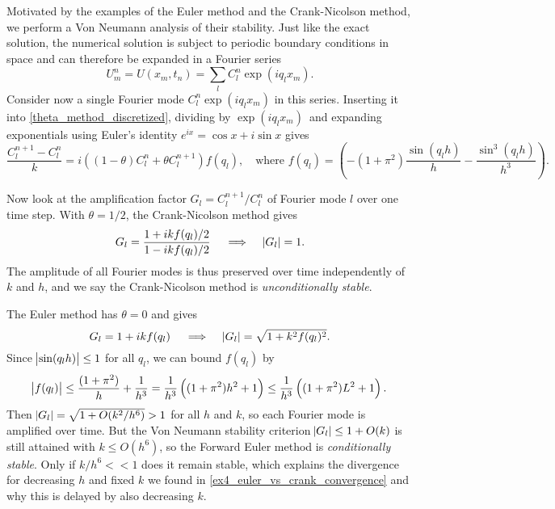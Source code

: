 Motivated by the examples of the Euler method and the Crank-Nicolson method, we perform a Von Neumann analysis of their stability.
Just like the exact solution, the numerical solution is subject to periodic boundary conditions in space and can therefore be expanded in a Fourier series \cite{Kreyszig}
\begin{equation}
	U_m^n = U(x_m, t_n) = \sum_l C_l^n \exp \left(i q_l x_m\right).
\end{equation}
Consider now a single Fourier mode $C_l^n \exp (i q_l x_m)$ in this series.
Inserting it into \cref{theta_method_discretized}, dividing by $\exp(i q_l x_m)$ and expanding exponentials using Euler's identity $e^{ix} = \cos x + i \sin x$ gives
\begin{equation*}
\frac{C_l^{n+1}-C_l^n}{k} = i \left(\left(1-\theta\right)C_l^n+\theta C_l^{n+1}\right) f(q_l) , \quad \text{where} \,\, f(q_l) = \left(-\left(1+\pi^2\right) \frac{\sin(q_l h)}{h} - \frac{\sin^3(q_l h)}{h^3}\right).
\end{equation*}

Now look at the amplification factor $G_l = C_l^{n+1} / C_l^n$ of Fourier mode $l$ over one time step. 
With $\theta = 1/2$, the Crank-Nicolson method gives 
\begin{equation}
	G_l = \frac{1 + i k f(q_l) / 2}{1 - i k f(q_l) / 2} \quad \implies \quad \abs{G_l} = 1.
	\label{crank_Nicolson_amplification_factor}
\end{equation}
The amplitude of all Fourier modes is thus preserved over time independently of $k$ and $h$, and we say the Crank-Nicolson method is \emph{unconditionally stable}.

The Euler method has $\theta = 0$ and gives
\begin{equation}
	G_l = 1 + i k f(q_l) \quad \implies \quad \abs{G_l} = \sqrt{1 + k^2 f(q_l)^2}.
	\label{euler_amplification_factor}
\end{equation}
Since $\abs{\sin(q_l h)} \leq 1$ for all $q_l$, we can bound $f(q_l)$ by
\begin{equation*}
	\abs{f(q_l)} \leq \frac{(1+\pi^2)}{h} + \frac{1}{h^3} = \frac{1}{h^3} \left( (1+\pi^2) h^2 + 1 \right) \leq \frac{1}{h^3} \left( (1+\pi^2) L^2 + 1 \right).
\end{equation*}
Then $\abs{G_l} = \sqrt{1 + O(k^2 / h^6)} > 1$ for all $h$ and $k$, so each Fourier mode is amplified over time.
But the Von Neumann stability criterion $\abs{G_l} \leq 1 + O(k)$ \cite{owren} is still attained with $k \leq O(h^6)$, so the Forward Euler method is \emph{conditionally stable}.
Only if $k/h^6 << 1$ does it remain stable, which explains the divergence for decreasing $h$ and fixed $k$ we found in \cref{ex4_euler_vs_crank_convergence} and why this is delayed by also decreasing $k$.

